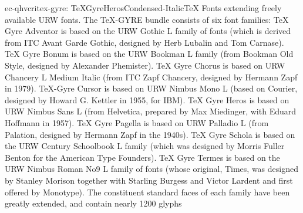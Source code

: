 \documentclass{ddltxtyp}
\begin{document}
\begin{package}{ec-qhvcri}{tex-gyre: TeXGyreHerosCondensed-Italic}{{\TeX} Fonts extending freely available URW fonts.}
The {\TeX}-GYRE bundle consists of six font families: {\TeX} Gyre
Adventor is based on the URW Gothic L family of fonts (which is
derived from ITC Avant Garde Gothic, designed by Herb Lubalin
and Tom Carnase). {\TeX} Gyre Bonum is based on the URW Bookman L
family (from Bookman Old Style, designed by Alexander
Phemister). {\TeX} Gyre Chorus is based on URW Chancery L Medium
Italic (from ITC Zapf Chancery, designed by Hermann Zapf in
1979). {\TeX}-Gyre Cursor is based on URW Nimbus Mono L (based on
Courier, designed by Howard G. Kettler in 1955, for IBM). {\TeX}
Gyre Heros is based on URW Nimbus Sans L (from Helvetica,
prepared by Max Miedinger, with Eduard Hoffmann in 1957). {\TeX}
Gyre Pagella is based on URW Palladio L (from Palation,
designed by Hermann Zapf in the 1940s). {\TeX} Gyre Schola is
based on the URW Century Schoolbook L family (which was
designed by Morris Fuller Benton for the American Type
Founders). {\TeX} Gyre Termes is based on the URW Nimbus Roman No9
L family of fonts (whose original, Times, was designed by
Stanley Morison together with Starling Burgess and Victor
Lardent and first offered by Monotype). The constituent
standard faces of each family have been greatly extended, and
contain nearly 1200 glyphs %
\end{package}
\end{document}
